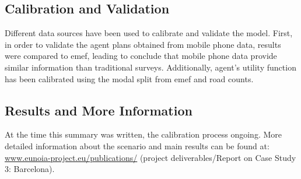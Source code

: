 \subsection{Calibration and Validation}
Different data sources have been used to calibrate and validate the model. First, in order to validate the agent plans obtained from mobile phone data, results were compared to \gls{emef}, leading to conclude that mobile phone data provide similar information than traditional surveys. Additionally, agent’s utility function has been calibrated using the modal split from \gls{emef} and road counts.

\subsection{Results and More Information}
At the time this summary was written, the calibration process ongoing. More detailed information about the scenario and main results can be found at:
\url{www.eunoia-project.eu/publications/} (project deliverables/Report on Case Study 3: Barcelona).

